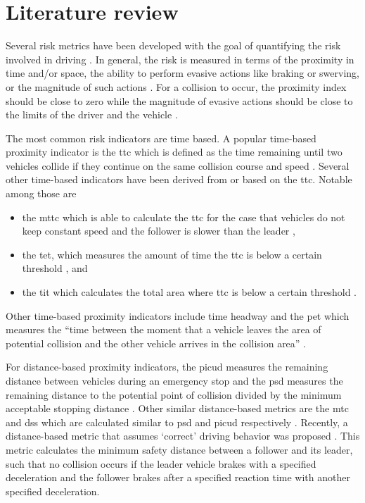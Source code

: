 \section{Literature review}
\label{sec:literature review}

Several risk metrics have been developed with the goal of quantifying the risk involved in driving \autocite{minderhoud2001extended, ozbay2008derivation, cunto2009simulated, laureshyn2010evaluation}.
In general, the risk is measured in terms of the proximity in time and/or space, the ability to perform evasive actions like braking or swerving, or the magnitude of such actions \autocite{shi2018key,zheng2020modeling}. 
For a collision to occur, the proximity index should be close to zero while the magnitude of evasive actions should be close to the limits of the driver and the vehicle \autocite{zheng2020modeling}. 

The most common risk indicators are time based. 
A popular time-based proximity indicator is the \ac{ttc} which is defined as the time remaining until two vehicles collide if they continue on the same collision course and speed \autocite{vanderhorst1990time}. 
Several other time-based indicators have been derived from or based on the \ac{ttc}. 
Notable among those are 
\begin{itemize}
    \item the \ac{mttc} which is able to calculate the \ac{ttc} for the case that vehicles do not keep constant speed and the follower is slower than the leader \autocite{ozbay2008derivation},
    \item the \ac{tet}, which measures the amount of time the \ac{ttc} is below a certain threshold \autocite{minderhoud2001extended}, and
    \item the \ac{tit} which calculates the total area where \ac{ttc} is below a certain threshold  \autocite{minderhoud2001extended}. 
\end{itemize}
Other time-based proximity indicators include time headway and the \ac{pet} which measures the ``time between the moment that a vehicle leaves the area of potential collision and the other vehicle arrives in the collision area'' \autocite{mahmud2017application}. 

For distance-based proximity indicators, the \ac{picud} measures the remaining distance between vehicles during an emergency stop \autocite{iida2001traffic, uno2003objective} and the \ac{psd} measures the remaining distance to the potential point of collision divided by the minimum acceptable stopping distance \autocite{allen1978analysis, guido2011comparing, mahmud2017application}. 
Other similar distance-based metrics are the \ac{mtc} and \ac{dss} which are calculated similar to \ac{psd} and \ac{picud} respectively \autocite{kitajima2009estimation, okamura2011impact}. 
Recently, a distance-based metric that assumes `correct' driving behavior was proposed \autocite{shalev2017formal}. 
This metric calculates the minimum safety distance between a follower and its leader, such that no collision occurs if the leader vehicle brakes with a specified deceleration and the follower brakes after a specified reaction time with another specified deceleration. 

